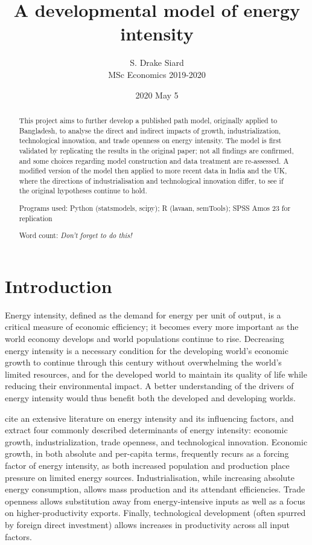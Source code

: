 \documentclass[11pt,a4paper]{article}
\title{\textbf{A developmental model of energy intensity}}
\author{S. Drake Siard\\
MSc Economics 2019-2020}
\date{2020 May 5}
\newcommand{\pkg}[1]{{\fontseries{b}\selectfont #1}}
\begin{document}
\maketitle

\begin{abstract}
This project aims to further develop a published path model, originally applied to Bangladesh, to analyse the direct and indirect impacts of growth, industrialization, technological innovation, and trade openness on energy intensity.
The model is first validated by replicating the results in the original paper; not all findings are confirmed, and some choices regarding model construction and data treatment are re-assessed.
A modified version of the model then applied to more recent data in India and the UK, where the directions of industrialisation and technological innovation differ, to see if the original hypotheses continue to hold.

Programs used: Python (\pkg{statsmodels}, \pkg{scipy}); R (\pkg{lavaan}, \pkg{semTools}); SPSS Amos 23 for replication

Word count: \em{Don't forget to do this!}
 
\end{abstract}

\tableofcontents

\pagebreak

\section{Introduction}\label{sec:introduction}

Energy intensity, defined as the demand for energy per unit of output, is a critical measure of economic efficiency; it becomes every more important as the world economy develops and world populations continue to rise.
Decreasing energy intensity is a necessary condition for the developing world's economic growth to continue through this century without overwhelming the world's limited resources, and for the developed world to maintain its quality of life while reducing their environmental impact.
A better understanding of the drivers of energy intensity would thus benefit both the developed and developing worlds.

\cite{panHowIndustrializationTrade2019} cite an extensive literature on energy intensity and its influencing factors, and extract four commonly described determinants of energy intensity: economic growth, industrialization, trade openness, and technological innovation.
Economic growth, in both absolute and per-capita terms, frequently recurs as a forcing factor of energy intensity, as both increased population and production place pressure on limited energy sources.
Industrialisation, while increasing absolute energy consumption, allows mass production and its attendant efficiencies.
Trade openness allows substitution away from energy-intensive inputs as well as a focus on higher-productivity exports. 
Finally, technological development (often spurred by foreign direct investment) allows increases in productivity across all input factors.
\end{document}
